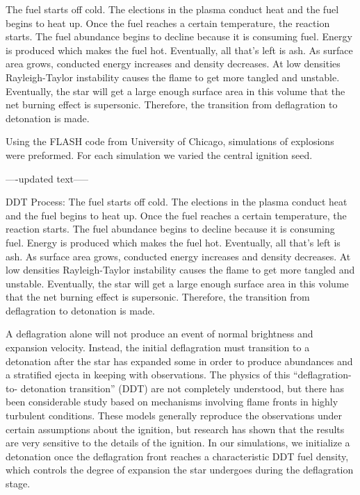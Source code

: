 \documentclass[iop,apj]{emulateapj}
\begin{document}
The fuel starts off cold. The elections in the plasma conduct heat and the
fuel begins to heat up. Once the fuel reaches a certain temperature, the
reaction starts. The fuel abundance begins to decline because it is consuming
fuel. Energy is produced which makes the fuel hot. Eventually, all that’s
left is ash. As surface area grows, conducted energy increases and density
decreases. At low densities Rayleigh-Taylor instability causes the flame to
get more tangled and unstable. Eventually, the star will get a large enough
surface area in this volume that the net burning effect is supersonic.
Therefore, the transition from deflagration to detonation is made. 

Using the FLASH code from University of Chicago, simulations of
explosions were preformed. For each simulation we varied the central
ignition seed. 

----updated text-----

DDT Process:
The fuel starts off cold. The elections in the plasma conduct heat
and the fuel begins to heat up. Once the fuel reaches a certain
temperature, the reaction starts. The fuel abundance begins to
decline because it is consuming fuel. Energy is produced which
makes the fuel hot. Eventually, all that’s left is ash. As
surface area grows, conducted energy increases and density
decreases. At low densities Rayleigh-Taylor instability causes
the flame to get more tangled and unstable. Eventually, the
star will get a large enough surface area in this volume that
the net burning effect is supersonic. Therefore, the transition
from deflagration to detonation is made.

A deflagration alone will not produce an event of normal
brightness and expansion velocity. Instead, the initial
deflagration must transition to a detonation after the star has
expanded some in order to produce abundances and a stratified
ejecta in keeping with observations. The physics of this
“deflagration-to- detonation transition” (DDT) are not
completely understood, but there has been considerable study
based on mechanisms involving flame fronts in highly turbulent
conditions. These models generally reproduce the observations
under certain assumptions about the ignition, but research has
shown that the results are very sensitive to the details of the
ignition. In our simulations, we initialize a detonation once
the deflagration front reaches a characteristic DDT fuel density,
which controls the degree of expansion the star undergoes during
the deflagration stage.
\end{document}
